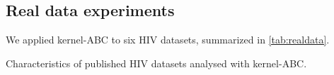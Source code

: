 \subsection{Real data experiments}

We applied kernel-\gls{ABC} to six \gls{HIV} datasets, summarized in
\cref{tab:realdata}.

\begin{table}
  \centering
  
  \caption{Characteristics of published HIV datasets analysed with kernel-ABC.}
  \label{tab:realdata}
\end{table}
